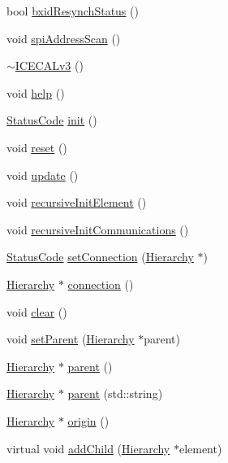 \begin{DoxyCompactItemize}
\item 
bool \hyperlink{classICECALv3_a545f51b915a6de5c5f450622d0651a85}{bxidResynchStatus} ()
\item 
void \hyperlink{classICECALv3_acbf1a7a8510d7e02280bacc58badf4f4}{spiAddressScan} ()
\item 
\hyperlink{classICECALv3_acdadf9483fc38a615192de41548024a1}{$\sim$ICECALv3} ()
\item 
void \hyperlink{classICECALv3_a00e572849b4952e7cf04a39f992df037}{help} ()
\item 
\hyperlink{classStatusCode}{StatusCode} \hyperlink{classICECALv3_abf7281fad80b80b70c5b13ce66ba3451}{init} ()
\item 
void \hyperlink{classICECALv3_a33afc7c8e0f399336152abd03cbe8d1b}{reset} ()
\item 
void \hyperlink{classICECALv3_ab2a00809e9a4f2ab83ef041a886ca637}{update} ()
\item 
void \hyperlink{classElement_a3c0abcb36f8906688bb7e32608df7086}{recursiveInitElement} ()
\item 
void \hyperlink{classElement_a82119ed37dff76508a2746a853ec35ba}{recursiveInitCommunications} ()
\item 
\hyperlink{classStatusCode}{StatusCode} \hyperlink{classElement_ab476b4b1df5954141ceb14f072433b89}{setConnection} (\hyperlink{classHierarchy}{Hierarchy} $\ast$)
\item 
\hyperlink{classHierarchy}{Hierarchy} $\ast$ \hyperlink{classElement_af57444353c1ddf9fa0109801e97debf7}{connection} ()
\item 
void \hyperlink{classHierarchy_af4d43b0765b402670eed2d62c73405af}{clear} ()
\item 
void \hyperlink{classHierarchy_a585ad1aeec16077a0e532ab8b4fc557b}{setParent} (\hyperlink{classHierarchy}{Hierarchy} $\ast$parent)
\item 
\hyperlink{classHierarchy}{Hierarchy} $\ast$ \hyperlink{classHierarchy_a1c7bec8257e717f9c1465e06ebf845fc}{parent} ()
\item 
\hyperlink{classHierarchy}{Hierarchy} $\ast$ \hyperlink{classHierarchy_ad550588733bf75ac5c0fcfd7c8fd11a6}{parent} (std::string)
\item 
\hyperlink{classHierarchy}{Hierarchy} $\ast$ \hyperlink{classHierarchy_aee461dc930ce3871636ff87f075b1b83}{origin} ()
\item 
virtual void \hyperlink{classHierarchy_ad677774ff38fcb257c04a3a10d471fac}{addChild} (\hyperlink{classHierarchy}{Hierarchy} $\ast$element)
\item 

\end{DoxyCompactItemize}
